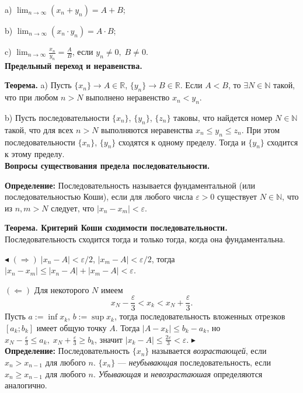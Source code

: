 \documentclass[12pt]{article}
\begin{document}
a) $\lim_{n\rightarrow \infty} (x_n + y_n) = A + B$;

b) $\lim_{n\rightarrow \infty} (x_n \cdot y_n) = A \cdot B$;

c) $\lim_{n\rightarrow \infty} \frac{x_n}{y_n} = \frac{A}{B}$, если $y_n \neq 0, \; B \neq 0$. \\

\textbf{Предельный переход и неравенства.}

\textbf{Теорема.} a) Пусть $ \{ x_n \} \rightarrow A \in \mathbb{R}$, $\{ y_n \} \longrightarrow B \in \mathbb{R}$. Если $A < B$, то $\exists N \in \mathbb{N}$ такой, что при любом $n  > N$ выполнено неравенство $x_n < y_n$.

b) Пусть последовательности $\{x_n\}$, $\{y_n\}$, $\{z_n\}$ таковы, что найдется номер $N \in \mathbb{N}$ такой, что для всех $n  > N$ выполняются неравенства $x_n \leq y_n \leq z_n$. При этом последовательности $\{x_n\}$, $\{y_n\}$ сходятся к одному пределу. Тогда и $\{ y_n \}$ сходится к этому пределу. \\


\textbf{Вопросы существования предела последовательности.}

\textbf{Определение:} Последовательность называется фундаментальной (или последовательностью Коши), если для любого числа $\varepsilon > 0$ существует $N \in \mathbb{N}$, что из $n,m > N$ следует, что $|x_n - x_m| < \varepsilon$. 

\textbf{Теорема. Критерий Коши сходимости последовательности.} Последовательность сходится тогда и только тогда, когда она фундаментальна.

$\blacktriangleleft$ $(\Rightarrow) \; |x_n - A| < \varepsilon / 2 $, $|x_m - A| < \varepsilon / 2$, тогда $|x_n - x_m| \leq |x_n - A| + |x_m - A| < \varepsilon$.

$(\Leftarrow)$ Для некоторого $N$ имеем 
$$
x_N - \frac{\varepsilon}{3} < x_k < x_N + \frac{\varepsilon}{3}.
$$
Пусть $a := \inf x_k$, $b := \sup x_k$, тогда последовательность вложенных отрезков $[a_k; b_k]$ имеет общую точку $A$. Тогда 
$|A - x_k| \leq b_k - a_k$, но $x_N - \frac{\varepsilon}{3} \leq a_k, \; x_N + \frac{\varepsilon}{3} \geq b_k$, значит 
$|x_k - A| \leq \frac{2\varepsilon}{3} < \varepsilon$.
$\blacktriangleright$ \\

\textbf{Определение:} Последовательность $\{ x_n\}$ называется \textit{возрастающей}, если $x_n > x_{n-1}$ для любого $n$. $\{ x_n \}$ --- \textit{неубывающая} последовательность, если $x_n \geq x_{n-1}$ для любого $n$. \textit{Убывающая} и \textit{невозрастаюшая} определяются аналогично.
\end{document}
